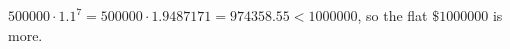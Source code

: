 $500000\cdot1.1^7=500000\cdot1.9487171=974358.55<1000000$, so the flat $\boxed{\$1000000}$ is more.
